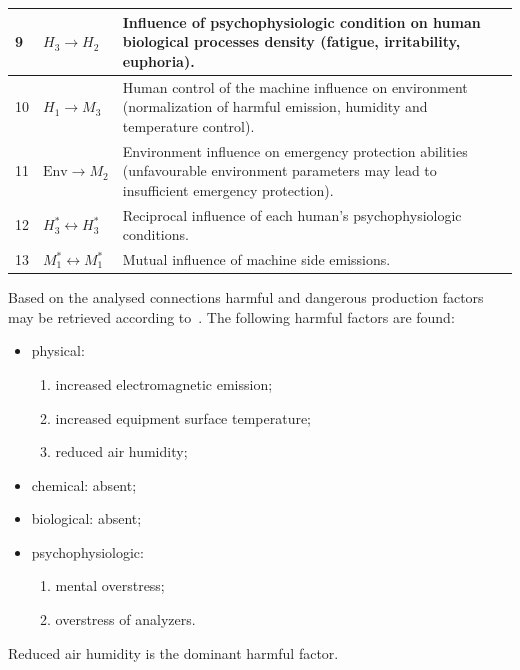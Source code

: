 \begin{longtable}{|p{}|p{}|p{}|}
    9 & $H_3 \rightarrow H_2$ & Influence of psychophysiologic condition on
    human biological processes density (fatigue, irritability, euphoria). \\ \hline 
    10 & $H_1 \rightarrow M_3$ & 
    Human control of the machine influence on environment (normalization of
    harmful emission, humidity and temperature control). \\ \hline
    11 & $\text{Env} \rightarrow M_2$ & Environment influence on emergency
    protection abilities (unfavourable environment parameters may lead to
    insufficient emergency protection). \\ \hline
    12 & $H^*_3 \leftrightarrow H^*_3$ & Reciprocal influence of each human's
    psychophysiologic conditions. \\ \hline
    13 & $M^*_1 \leftrightarrow M^*_1$ & Mutual influence of machine side
    emissions. \\ \hline
\end{longtable}

Based on the analysed connections harmful and dangerous production factors may
be retrieved according to~\cite{gost003}. The following harmful factors are
found:
\begin{itemize}
    \item physical: 
        \begin{enumerate}
            \item increased electromagnetic emission;
            \item increased equipment surface temperature;
            \item reduced air humidity;
        \end{enumerate}
    \item chemical: absent;
    \item biological: absent;
    \item psychophysiologic: 
        \begin{enumerate}
            \item mental overstress;
            \item overstress of analyzers.
        \end{enumerate}
\end{itemize}
Reduced air humidity is the dominant harmful factor.


